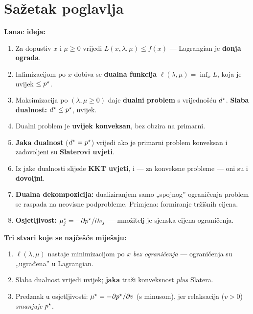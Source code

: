 \section{Sažetak poglavlja}

\textbf{Lanac ideja:}

\begin{enumerate}
  \item Za dopustiv $x$ i $\mu \ge 0$ vrijedi $L(x,\lambda,\mu) \le f(x)$ ---
        Lagrangian je \textbf{donja ograda}.
  \item Infimizacijom po $x$ dobiva se \textbf{dualna funkcija}
        $\ell(\lambda,\mu) = \inf_x L$, koja je uvijek $\le p^{\star}$.
  \item Maksimizacija po $(\lambda,\mu \ge 0)$ daje \textbf{dualni problem} s
        vrijednošću $d^{\star}$. \textbf{Slaba dualnost:} $d^{\star} \le p^{\star}$, uvijek.
  \item Dualni problem je \textbf{uvijek konveksan}, bez obzira na primarni.
  \item \textbf{Jaka dualnost} ($d^{\star} = p^{\star}$) vrijedi ako je primarni problem
        konveksan i zadovoljeni su \textbf{Slaterovi uvjeti}.
  \item Iz jake dualnosti slijede \textbf{KKT uvjeti}, i --- za konveksne
        probleme --- oni su i \textbf{dovoljni}.
  \item \textbf{Dualna dekompozicija:} dualiziranjem samo „spojnog” ograničenja
        problem se raspada na neovisne podprobleme. Primjena: formiranje
        tržišnih cijena.
  \item \textbf{Osjetljivost:} $\mu_j^{\star} = -\partial p^{\star}/\partial v_j$ ---
        množitelj je sjenska cijena ograničenja.
\end{enumerate}

\textbf{Tri stvari koje se najčešće miješaju:}

\begin{enumerate}
  \item $\ell(\lambda,\mu)$ nastaje minimizacijom po $x$ \emph{bez ograničenja}
        --- ograničenja su „ugrađena” u Lagrangian.
  \item Slaba dualnost vrijedi uvijek; \textbf{jaka} traži konveksnost
        \emph{plus} Slatera.
  \item Predznak u osjetljivosti: $\mu^{\star} = -\partial p^{\star}/\partial v$
        (s minusom), jer relaksacija ($v>0$) \emph{smanjuje} $p^{\star}$.
\end{enumerate}

